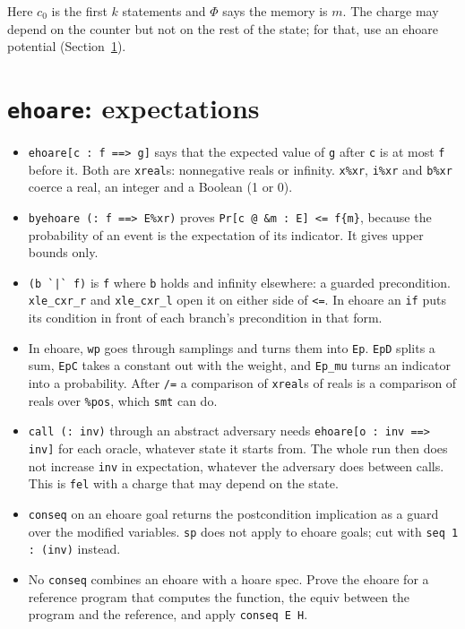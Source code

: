 \documentclass[10pt,a4paper]{article}
\newcommand{\ec}{\lstinline[basicstyle=\small\ttfamily]}
\begin{document}
\noindent
Here $c_0$ is the first $k$ statements and $\Phi$ says the memory is $m$.
The charge may depend on the counter but not on the rest of the state; for that, use an ehoare potential (Section~\ref{sec:ehoare}).



\section{\texorpdfstring{\texttt{ehoare}}{ehoare}: expectations}\label{sec:ehoare}

\begin{itemize}
  \item \ec|ehoare[c : f ==> g]| says that the expected value of \ec|g| after \ec|c| is at most \ec|f| before it.
    Both are \ec|xreal|s: nonnegative reals or infinity.
    \ec|x%
  \item \ec|byehoare (: f ==> E%
    It gives upper bounds only.
  \item \ec!(b `|` f)! is \ec|f| where \ec|b| holds and infinity elsewhere: a guarded precondition.
    \ec|xle_cxr_r| and \ec|xle_cxr_l| open it on either side of \ec|<=|.
    In ehoare an \ec|if| puts its condition in front of each branch's precondition in that form.
  \item In ehoare, \ec|wp| goes through samplings and turns them into \ec|Ep|.
    \ec|EpD| splits a sum, \ec|EpC| takes a constant out with the weight, and \ec|Ep_mu| turns an indicator into a probability.
    After \ec|/=| a comparison of \ec|xreal|s of reals is a comparison of reals over \ec|%
  \item \ec|call (: inv)| through an abstract adversary needs \ec|ehoare[o : inv ==> inv]| for each oracle, whatever state it starts from.
    The whole run then does not increase \ec|inv| in expectation, whatever the adversary does between calls.
    This is \ec|fel| with a charge that may depend on the state.
  \item \ec|conseq| on an ehoare goal returns the postcondition implication as a guard over the modified variables.
    \ec|sp| does not apply to ehoare goals; cut with \ec|seq 1 : (inv)| instead.
  \item No \ec|conseq| combines an ehoare with a hoare spec.
    Prove the ehoare for a reference program that computes the function, the equiv between the program and the reference, and apply \ec|conseq E H|.
\end{itemize}
\end{document}
